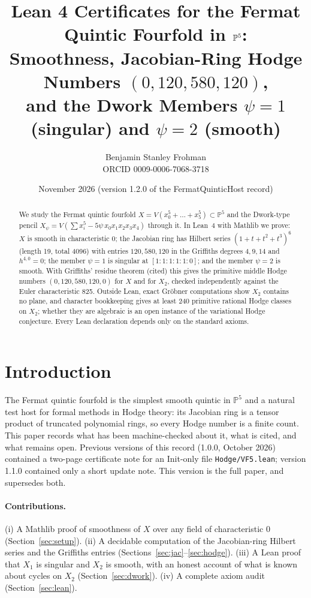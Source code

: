 \documentclass[11pt]{article}
\title{Lean 4 Certificates for the Fermat Quintic Fourfold in $\PP^5$:\\ Smoothness, Jacobian-Ring Hodge Numbers $(0,120,580,120)$,\\ and the Dwork Members $\psi=1$ (singular) and $\psi=2$ (smooth)}
\author{Benjamin Stanley Frohman\\ \small ORCID 0009-0006-7068-3718}
\date{November 2026 (version 1.2.0 of the FermatQuinticHost record)}
\theoremstyle{definition}\newtheorem{definition}[theorem]{Definition}\newtheorem{remark}[theorem]{Remark}
\newcommand{\PP}{\mathbb{P}}\newcommand{\CC}{\mathbb{C}}\newcommand{\QQ}{\mathbb{Q}}
\begin{document}
\maketitle
{}\par

\begin{abstract}
We study the Fermat quintic fourfold $X=V(x_0^5+\dots+x_5^5)\subset\PP^5$ and the Dwork-type pencil
$X_\psi=V(\sum x_i^5-5\psi\,x_0x_1x_2x_3x_4)$ through it. In Lean~4 with Mathlib we prove: $X$ is smooth in
characteristic $0$; the Jacobian ring has Hilbert series $(1+t+t^2+t^3)^6$ (length 19, total 4096) with
entries $120,580,120$ in the Griffiths degrees $4,9,14$ and $h^{4,0}=0$; the member $\psi=1$ is singular at
$[1:1:1:1:1:0]$; and the member $\psi=2$ is smooth. With Griffiths' residue theorem (cited) this gives the
primitive middle Hodge numbers $(0,120,580,120,0)$ for $X$ and for $X_2$, checked independently against the
Euler characteristic 825. Outside Lean, exact Gr\"obner computations show $X_2$ contains no plane, and character
bookkeeping gives at least 240 primitive rational Hodge classes on $X_2$; whether they are algebraic is an open
instance of the variational Hodge conjecture. Every Lean declaration depends only on the standard axioms.
\end{abstract}
\tableofcontents
\section{Introduction}
The Fermat quintic fourfold is the simplest smooth quintic in $\PP^5$ and a natural test host for formal
methods in Hodge theory: its Jacobian ring is a tensor product of truncated polynomial rings, so every Hodge
number is a finite count. This paper records what has been machine-checked about it, what is cited, and what
remains open. Previous versions of this record (1.0.0, October 2026) contained a two-page certificate note for
an Init-only file \texttt{Hodge/VF5.lean}; version 1.1.0 contained only a short update note. This version is
the full paper, and supersedes both.

\paragraph{Contributions.}
(i) A Mathlib proof of smoothness of $X$ over any field of characteristic $0$ (Section~\ref{sec:setup}).
(ii) A decidable computation of the Jacobian-ring Hilbert series and the Griffiths entries (Sections~\ref{sec:jac}--\ref{sec:hodge}).
(iii) A Lean proof that $X_1$ is singular and $X_2$ is smooth, with an honest account of what is known about cycles on $X_2$ (Section~\ref{sec:dwork}).
(iv) A complete axiom audit (Section~\ref{sec:lean}).
\end{document}
